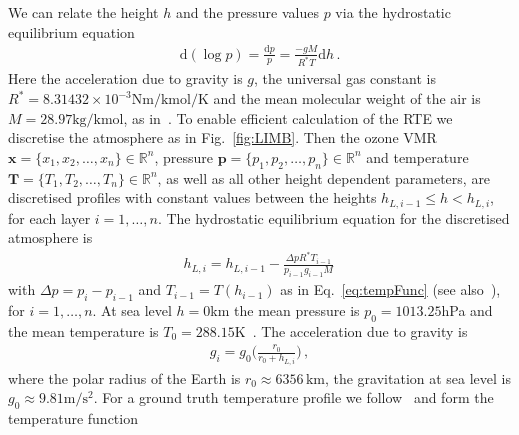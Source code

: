 \documentclass{article}
\begin{document}
We can relate the height $h$ and the pressure values $p$ via the hydrostatic equilibrium equation
\begin{align}
	\text{d}(\log p) = \frac{\text{d}p}{p} = \frac{- g M}{R^* T} \text{d} h \, .\label{eq:hydr}
\end{align}
Here the acceleration due to gravity is $g$, the universal gas constant is $R^* = 8.31432 \times 10^{-3} \text{Nm} / \text{kmol} / \text{K}$ and the mean molecular weight of the air is $M = 28.97 \text{kg/kmol}$, as in~\cite{atmosphere1976us}.
To enable efficient calculation of the RTE we discretise the atmosphere as in Fig.~\ref{fig:LIMB}.
Then the ozone VMR $\bm{x} =\{x_1,x_2,\ldots,x_n\} \in \mathbb{R}^{n}$, pressure $\bm{p} =\{p_1,p_2,\ldots,p_n\} \in \mathbb{R}^{n}$ and temperature $\bm{T} =\{T_1,T_2,\ldots,T_n\} \in \mathbb{R}^{n}$, as well as all other height dependent parameters, are discretised profiles with constant values between the heights $h_{L,i-1} \leq h < h_{L,i}$, for each layer $i = 1,\dots, n$.
The hydrostatic equilibrium equation for the discretised atmosphere is
\begin{align}
	h_{L,i} =  h_{L,i-1} - \frac{\Delta p R^* T_{i-1}  }{p_{i-1}  g_{i-1} M} \, 
\end{align}
with $\Delta p = p_{i} - p_{i-1}$ and $T_{i-1} = T(h_{i-1})$ as in Eq.~\ref{eq:tempFunc} (see also~\cite{Carlotti99,Ridolfi00}), for $i = 1,\dots, n$.
At sea level $h = 0$km the mean pressure is $p_0 = 1013.25$hPa and the mean temperature is $T_0 = 288.15$K~\cite{atmosphere1976us}.
The acceleration due to gravity is
\begin{align}
	g_i = g_0 \Bigg( \frac{r_0}{r_0 + h_{L,i}} \Bigg) \, ,
\end{align}
where the polar radius of the Earth is $r_0 \approx 6356 \, \text{km}$, the gravitation at sea level is $g_0 \approx 9.81 \text{m}/\text{s}^2$.
For a ground truth temperature profile we follow~\cite{atmosphere1976us} and form the temperature function
\end{document}
